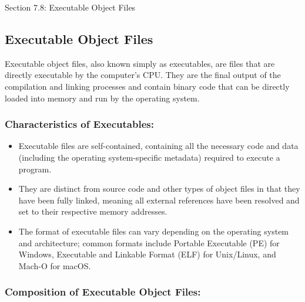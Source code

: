 \begin{notes}{Section 7.8: Executable Object Files}
    \subsection*{Executable Object Files}

    Executable object files, also known simply as executables, are files that are directly executable by the computer's CPU. They are the final output of the compilation and linking processes and contain 
    binary code that can be directly loaded into memory and run by the operating system. \vspace*{1em}
    
    \subsubsection*{Characteristics of Executables:}
    
    \begin{itemize}
        \item Executable files are self-contained, containing all the necessary code and data (including the operating system-specific metadata) required to execute a program.
        \item They are distinct from source code and other types of object files in that they have been fully linked, meaning all external references have been resolved and set to their respective memory addresses.
        \item The format of executable files can vary depending on the operating system and architecture; common formats include Portable Executable (PE) for Windows, Executable and Linkable Format 
        (ELF) for Unix/Linux, and Mach-O for macOS.
    \end{itemize}
    
    \subsubsection*{Composition of Executable Object Files:}
    

\end{notes}
